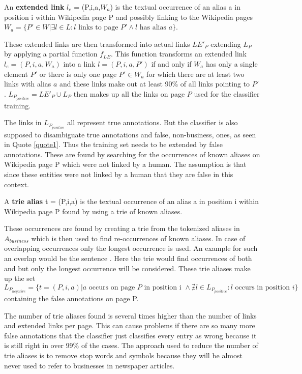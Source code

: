 \begin{definition}
An \textbf{extended link} $l_e$ = (P,i,a,$W_a$) is the textual occurrence of an alias a in position i within Wikipedia page P and possibly linking to the Wikipedia pages $W_a = \{ P' \in W | \exists l \in L: l \text{ links to page } P' \land l \text{ has alias } a \}$.
\label{extendedlink}
\end{definition}
These extended links are then transformed into actual links $LE'_P$ extending $L_P$ by applying a partial function $f_{LE}$.
This function transforms an extended link $l_e = (P,i,a,W_a)$ into a link $l = (P,i,a,P')$ if and only if $W_a$ has only a single element $P'$ or there is only one page $P' \in W_a$ for which there are at least two links with alias $a$ and these links make out at least 90\% of all links pointing to $P'$. $L_{P_{positive}} = LE'_P \cup L_P$ then makes up all the links on page $P$ used for the classifier training.\par
The links in $L_{P_{positive}}$ all represent true annotations. But the classifier is also supposed to disambiguate true annotations and false, non-business, ones, as seen in Quote \ref{quote1}. Thus the training set needs to be extended by false annotations. These are found by searching for the occurrences of known aliases on Wikipedia page P which were not linked by a human. The assumption is that since these entities were not linked by a human that they are false in this context.
\begin{definition}
A \textbf{trie alias} t = (P,i,a) is the textual occurrence of an alias a in position i within Wikipedia page P found by using a trie of known aliases.
\label{triealias}
\end{definition}
These occurrences are found by creating a trie from the tokenized aliases in $A_{business}$ which is then used to find re-occurrences of known aliases. In case of overlapping occurrences only the longest occurrence is used. An example for such an overlap would be the sentence . Here the trie would find occurrences of both  and  but only the longest occurrence will be considered. These trie aliases make up the set $L_{P_{negative}} = \{ t = (P,i,a) | a \text{ occurs on page } P \text{ in position i } \land \nexists l \in L_{P_{positive}}: l \text{ occurs in position } i \}$ containing the false annotations on page P.\par
The number of trie aliases found is several times higher than the number of links and extended links per page. This can cause problems if there are so many more false annotations that the classifier just classifies every entry as wrong because it is still right in over 99\% of the cases. The approach used to reduce the number of trie aliases is to remove stop words and symbols because they will be almost never used to refer to businesses in newspaper articles.\par
